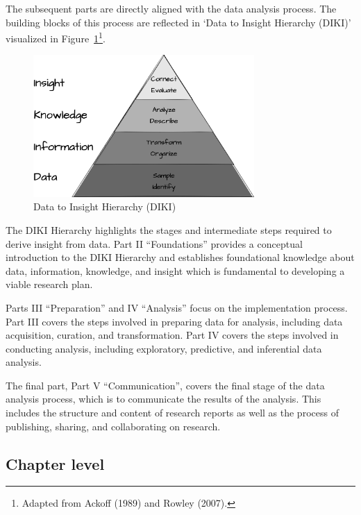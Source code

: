 \documentclass[
  letterpaper,
]{latex/krantz}
\begin{document}
The subsequent parts are directly aligned with the data analysis
process. The building blocks of this process are reflected in `Data to
Insight Hierarchy (DIKI)' visualized in
Figure~\ref{fig-diki-hierarchy}\footnote{Adapted from Ackoff (1989) and
  Rowley (2007).}.

\begin{figure}[h]

{\centering \includegraphics[width=0.75\textwidth,height=\textheight]{figures/preface/p-diki.drawio.png}

}

\caption{\label{fig-diki-hierarchy}Data to Insight Hierarchy (DIKI)}

\end{figure}

The DIKI Hierarchy highlights the stages and intermediate steps required
to derive insight from data. Part II ``Foundations'' provides a
conceptual introduction to the DIKI Hierarchy and establishes
foundational knowledge about data, information, knowledge, and insight
which is fundamental to developing a viable research plan.

Parts III ``Preparation'' and IV ``Analysis'' focus on the
implementation process. Part III covers the steps involved in preparing
data for analysis, including data acquisition, curation, and
transformation. Part IV covers the steps involved in conducting
analysis, including exploratory, predictive, and inferential data
analysis.

The final part, Part V ``Communication'', covers the final stage of the
data analysis process, which is to communicate the results of the
analysis. This includes the structure and content of research reports as
well as the process of publishing, sharing, and collaborating on
research.

\hypertarget{chapter-level}{%
\subsection*{Chapter level}\label{chapter-level}}
\end{document}
